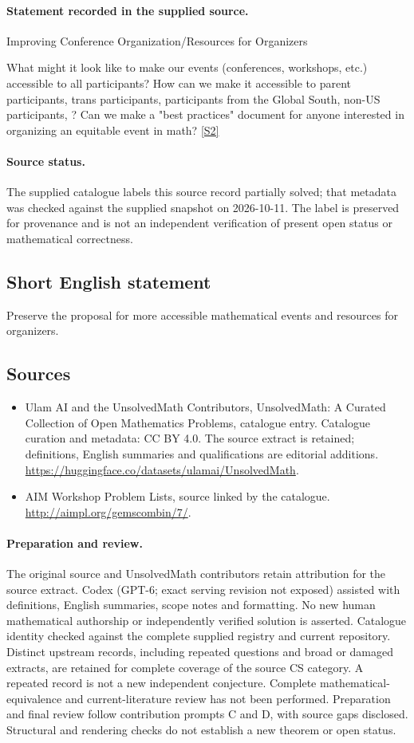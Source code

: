 \documentclass[11pt]{article}
\newcommand{\sref}[2]{\hyperlink{source:#1:#2}{[S#2]}}
\begin{document}
\paragraph{Statement recorded in the supplied source.}
Improving Conference Organization/Resources for Organizers

What might it look like to make our events (conferences, workshops, etc.) accessible to all participants? How can we make it accessible to parent participants, trans participants, participants from the Global South, non-US participants, ? Can we make a "best practices" document for anyone interested in organizing an equitable event in math? \sref{statement}{2}
\paragraph{Source status.}
The supplied catalogue labels this source record partially solved; that metadata was checked against the supplied snapshot on 2026-10-11. The label is preserved for provenance and is not an independent verification of present open status or mathematical correctness.
\subsection{Short English statement}
Preserve the proposal for more accessible mathematical events and resources for organizers.
\subsection{Sources}
\begin{itemize}
\item[\hypertarget{source:statement:1}{S1}] Ulam AI and the UnsolvedMath Contributors, UnsolvedMath: A Curated Collection of Open Mathematics Problems, catalogue entry. Catalogue curation and metadata: CC BY 4.0. The source extract is retained; definitions, English summaries and qualifications are editorial additions.
\url{https://huggingface.co/datasets/ulamai/UnsolvedMath}.
\item[\hypertarget{source:statement:2}{S2}] AIM Workshop Problem Lists, source linked by the catalogue.
\url{http://aimpl.org/gemscombin/7/}.
\end{itemize}
\paragraph{Preparation and review.}
The original source and UnsolvedMath contributors retain attribution for the source extract. Codex (GPT-6; exact serving revision not exposed) assisted with definitions, English summaries, scope notes and formatting. No new human mathematical authorship or independently verified solution is asserted. Catalogue identity checked against the complete supplied registry and current repository. Distinct upstream records, including repeated questions and broad or damaged extracts, are retained for complete coverage of the source CS category. A repeated record is not a new independent conjecture. Complete mathematical-equivalence and current-literature review has not been performed. Preparation and final review follow contribution prompts C and D, with source gaps disclosed. Structural and rendering checks do not establish a new theorem or open status.
\label{end:statement}
\end{document}
